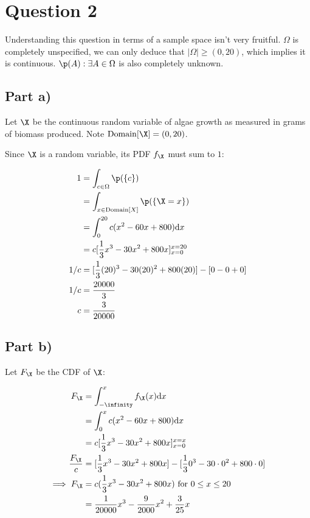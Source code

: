 \vspace{0.5cm}

\section{Question 2}

Understanding this question in terms of a sample space isn't very fruitful.
$\Omega$ is completely unspecified, we can only deduce that $|\Omega| \geq (0, 20)$, which implies it is continuous.
$\p (A) : \exists A \in \Omega$ is also completely unknown.

\subsection{Part a)}

Let $\X$ be the continuous random variable of algae growth as measured in grams of biomass produced.
Note $\mathrm{Domain}[\X] = (0, 20)$.

Since $\X$ is a random variable, its PDF $f_{\X}$ must sum to $1$:

\begin{align}
1 &= \int _{c \in \Omega} \p (\{ c \}) \\
&= \int _{x \in \mathrm{Domain}[X]} \p(\{ \X = x \}) \\
&= \int _0 ^{20} c(x^2 - 60x + 800) \mathrm{d}x \\
&= c[\frac{1}{3}x^3 - 30x^2 + 800x]_{x = 0}^{x=20} \\
1/c &= [\frac{1}{3}(20)^3 - 30(20)^2 + 800(20)] - [0 - 0 + 0] \\
1/c &= \frac{20000}{3} \\
c &= \frac{3}{20000}
\end{align}

\subsection{Part b)}

Let $F_{\X}$ be the CDF of $\X$:

\begin{align}
F_{\X} &= \int _{-\infinity} ^{x} f_{\X}(x) \mathrm{d}x \\
&= \int _0 ^{x} c(x^2 - 60x + 800) \mathrm{d}x \\
&= c [\frac{1}{3}x^3 - 30x^2 + 800x]_{x =0}^{x = x} \\
\frac{F_{\X}}{c} &= [\frac{1}{3} x^3 - 30x^2 + 800x] - [\frac{1}{3} 0^3 - 30\cdot0^2 + 800\cdot0] \\
\implies F_{\X} &= c(\frac{1}{3} x^3 - 30x^2 + 800x) \text{ for } 0 \leq x \leq 20 \\
&= \frac{1}{20000}x^3 - \frac{9}{2000}x^2 + \frac{3}{25}x
\end{align}


